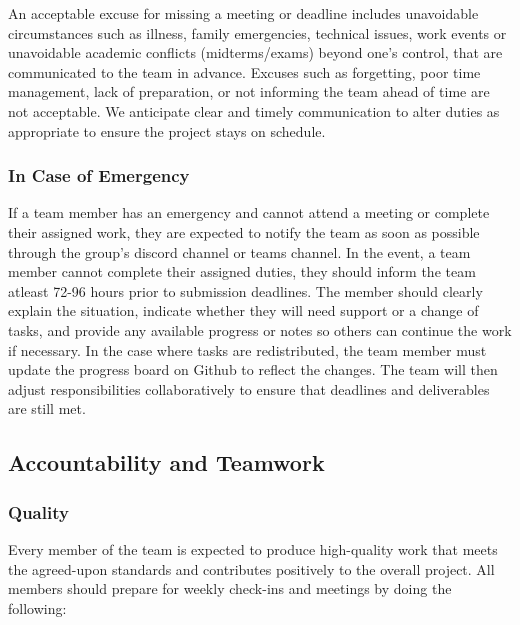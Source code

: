 \documentclass{article}
\begin{document}
An acceptable excuse for missing a meeting or deadline includes unavoidable circumstances 
such as illness, family emergencies, technical issues, work events or unavoidable academic conflicts (midterms/exams) beyond one’s control,
that are communicated to the team in advance.
Excuses such as forgetting, poor time management, lack of preparation, or not informing the team
ahead of time are not acceptable. We anticipate clear and timely communication to alter duties as
appropriate to ensure the project stays on schedule. 

\subsubsection*{In Case of Emergency}

If a team member has an emergency and cannot attend a meeting or complete their assigned work, they 
are expected to notify the team as soon as possible through the group’s discord channel or teams channel. In the event, 
a team member cannot complete their assigned duties, they should inform the team atleast 72-96 hours prior to submission deadlines.
The member should clearly explain the situation, indicate whether they will need support or a change 
of tasks, and provide any available progress or notes so others can continue the work if necessary. In the case where tasks are redistributed,
the team member must update the progress board on Github to reflect the changes. 
The team will then adjust responsibilities collaboratively to ensure that deadlines and deliverables are still met.

\subsection*{Accountability and Teamwork}

\subsubsection*{Quality} 

Every member of the team is expected to produce high-quality work that meets the agreed-upon standards and contributes positively to the 
overall project. All members should prepare for weekly check-ins and meetings by doing the
following:
\end{document}
